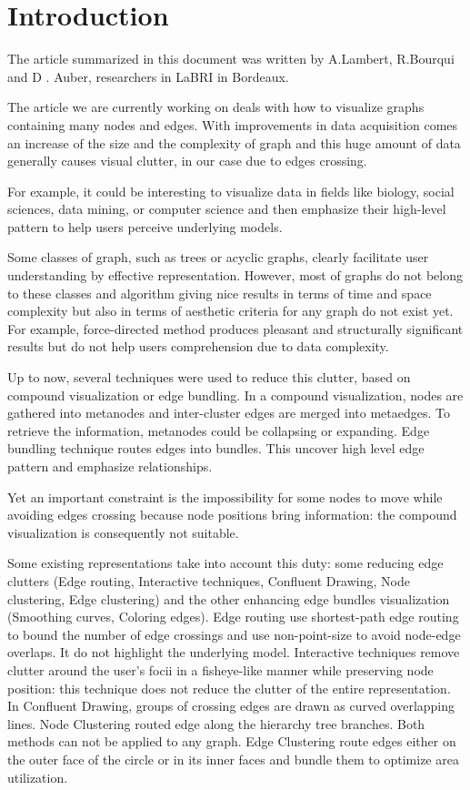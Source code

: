\chapter*{Introduction}

The article summarized in this document was written by A.Lambert, R.Bourqui and D . Auber, researchers in LaBRI in Bordeaux.

The article we are currently working on deals with how to visualize graphs containing many nodes and edges. With improvements in data acquisition comes an increase of the size and the complexity of graph and this huge amount of data generally causes visual clutter, in our case due to edges crossing.

For example, it could be interesting to visualize data in fields like biology, social sciences, data mining, or computer science and then emphasize their high-level pattern to help users perceive underlying models.

Some classes of graph, such as trees or acyclic graphs, clearly facilitate user understanding by effective representation. However, most of graphs do not belong to these classes and algorithm giving nice results in terms of time and space complexity but also in terms of aesthetic criteria for any graph do not exist yet. For example, force-directed method produces pleasant and structurally significant results but do not help users comprehension due to data complexity.

Up to now, several techniques were used to reduce this clutter, based on compound visualization or edge bundling. In a compound visualization, nodes are gathered into metanodes and inter-cluster edges are merged into metaedges. To retrieve the information, metanodes could be collapsing or expanding. Edge bundling technique routes edges into bundles. This uncover high level edge pattern and emphasize relationships.

Yet an important constraint is the impossibility for some nodes to move while avoiding edges crossing because node positions bring information: the compound visualization is consequently not suitable.

Some existing representations take into account this duty: some reducing edge clutters (Edge routing, Interactive techniques, Confluent Drawing, Node clustering, Edge clustering) and the other enhancing edge bundles visualization (Smoothing curves, Coloring edges). Edge routing use shortest-path edge routing to bound the number of edge crossings and use non-point-size to avoid node-edge overlaps. It do not highlight the underlying model. Interactive techniques remove clutter around the user’s focii in a fisheye-like manner while preserving node position: this technique does not reduce the clutter of the entire representation. In Confluent Drawing, groups of crossing edges are drawn as curved overlapping lines. Node Clustering routed edge along the hierarchy tree branches. Both methods can not be applied to any graph.
Edge Clustering route edges either on the outer face of the circle or in its inner faces and bundle them to optimize area utilization.

